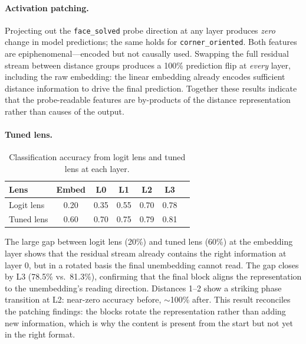 \documentclass[12pt]{article}
\begin{document}
\paragraph{Activation patching.}
Projecting out the \texttt{face\_solved} probe direction at any layer produces
\emph{zero} change in model predictions; the same holds for
\texttt{corner\_oriented}.  Both features are epiphenomenal---encoded but not
causally used.  Swapping the full residual stream between distance groups produces
a 100\% prediction flip at \emph{every} layer, including the raw embedding: the
linear embedding already encodes sufficient distance information to drive the final
prediction.  Together these results indicate that the probe-readable features are
by-products of the distance representation rather than causes of the output.

\paragraph{Tuned lens.}
\begin{table}[h]
\centering
\small
\begin{tabular}{lcccccc}
\toprule
Lens & Embed & L0 & L1 & L2 & L3 \\
\midrule
Logit lens  & 0.20 & 0.35 & 0.55 & 0.70 & 0.78 \\
Tuned lens  & 0.60 & 0.70 & 0.75 & 0.79 & 0.81 \\
\bottomrule
\end{tabular}
\caption{Classification accuracy from logit lens and tuned lens at each layer.}
\label{tab:lens}
\end{table}

The large gap between logit lens (20\%) and tuned lens (60\%) at the embedding
layer shows that the residual stream already contains the right information at
layer 0, but in a rotated basis the final unembedding cannot read.  The gap
closes by L3 (78.5\% vs.\ 81.3\%), confirming that the final block aligns the
representation to the unembedding's reading direction.  Distances 1--2 show a
striking phase transition at L2: near-zero accuracy before, $\sim$100\% after.
This result reconciles the patching findings: the blocks rotate the representation
rather than adding new information, which is why the content is present from the
start but not yet in the right format.
\end{document}
